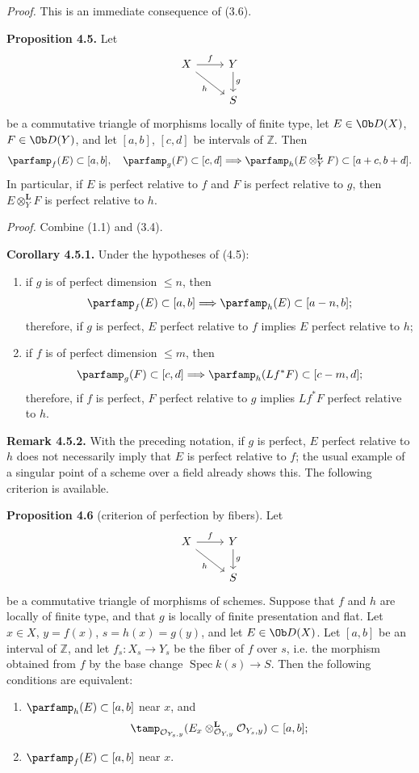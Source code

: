 \documentclass[11pt]{article}
\newcommand{\Spec}{\operatorname{Spec}}
\begin{document}
\emph{Proof.} This is an immediate consequence of (3.6).

\textbf{Proposition 4.5.} Let
\[
\begin{tikzcd}
X \arrow[r,"f"] \arrow[dr,"h"'] & Y \arrow[d,"g"]\\
& S
\end{tikzcd}
\]
be a commutative triangle of morphisms locally of finite type, let \(E\in\Ob D(X)\), \(F\in\Ob D(Y)\), and let \([a,b]\), \([c,d]\) be intervals of \(\mathbb Z\). Then
\[
 \parfamp_f(E)\subset[a,b],\quad
 \parfamp_g(F)\subset[c,d]
 \Longrightarrow
 \parfamp_h(E\otimes_Y^{\mathbf L}F)
     \subset[a+c,b+d].
\]
In particular, if \(E\) is perfect relative to \(f\) and \(F\) is perfect relative to \(g\), then \(E\otimes_Y^{\mathbf L}F\) is perfect relative to \(h\).

\emph{Proof.} Combine (1.1) and (3.4).

\textbf{Corollary 4.5.1.} Under the hypotheses of (4.5):
\begin{enumerate}[label=\alph*)]
\item if \(g\) is of perfect dimension \(\leq n\), then
\[
 \parfamp_f(E)
  \subset[a,b]
 \Longrightarrow
 \parfamp_h(E)
  \subset[a-n,b];
\]
therefore, if \(g\) is perfect, \(E\) perfect relative to \(f\) implies \(E\) perfect relative to \(h\);
\item if \(f\) is of perfect dimension \(\leq m\), then
\[
 \parfamp_g(F)
  \subset[c,d]
 \Longrightarrow
 \parfamp_h(Lf^*F)
  \subset[c-m,d];
\]
therefore, if \(f\) is perfect, \(F\) perfect relative to \(g\) implies \(Lf^*F\) perfect relative to \(h\).
\end{enumerate}

\textbf{Remark 4.5.2.} With the preceding notation, if \(g\) is perfect, \(E\) perfect relative to \(h\) does not necessarily imply that \(E\) is perfect relative to \(f\); the usual example of a singular point of a scheme over a field already shows this. The following criterion is available.

\textbf{Proposition 4.6} (criterion of perfection by fibers). Let
\[
\begin{tikzcd}
X \arrow[r,"f"] \arrow[dr,"h"'] & Y \arrow[d,"g"]\\
& S
\end{tikzcd}
\]
be a commutative triangle of morphisms of schemes. Suppose that \(f\) and \(h\) are locally of finite type, and that \(g\) is locally of finite presentation and flat. Let \(x\in X\), \(y=f(x)\), \(s=h(x)=g(y)\), and let \(E\in\Ob D(X)\). Let \([a,b]\) be an interval of \(\mathbb Z\), and let \(f_s:X_s\to Y_s\) be the fiber of \(f\) over \(s\), i.e. the morphism obtained from \(f\) by the base change \(\Spec k(s)\to S\). Then the following conditions are equivalent:
\begin{enumerate}[label=\roman*)]
\item \(\parfamp_h(E)\subset[a,b]\) near \(x\), and
\[
 \tamp_{\mathcal O_{Y_s,y}}(E_x\otimes_{\mathcal O_{Y,y}}^{\mathbf L}\mathcal O_{Y_s,y})
 \subset[a,b];
\]
\item \(\parfamp_f(E)\subset[a,b]\) near \(x\).
\end{enumerate}
\end{document}
